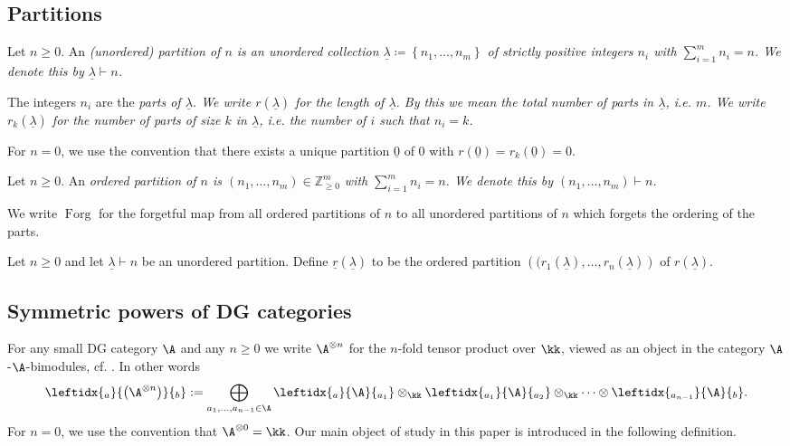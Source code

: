 \documentclass[12pt,a4paper,reqno]{amsart}
\DeclareMathOperator{\forget}{{Forg}}
\begin{document}
\subsection{Partitions}
\label{section-partitions}

\begin{defn}
Let $n \geq 0$. An \em (unordered) partition of $n$ \rm 
is an unordered collection 
$\underline{\lambda}\coloneqq \left\{ n_1, \dots, n_m \right\}$ of strictly
positive integers $n_i$ with $\sum_{i=1}^m n_i = n$. We denote this by 
$\underline{\lambda} \vdash n$. 
\end{defn}

The integers $n_i$ are the \em parts \rm of $\underline{\lambda} $. 
We write $r(\underline{\lambda} )$ for the \em length \rm of $\underline{\lambda} $. 
By this we mean the total number of parts in $\underline{\lambda}$, i.e. $m$. 
We write $r_k(\underline{\lambda} )$ for
the number of parts of size $k$ in $\underline{\lambda} $, i.e. the number of $i$ such 
that $n_i = k$.

For $n = 0$, we use the convention that there exists a unique
partition $\underline{0}$ of $0$ with $r(\underline{0}) =
r_k(\underline{0}) = 0$. 

\begin{defn}
Let $n \geq 0$. An \em ordered partition of $n$ \rm 
is $(n_1, \dots, n_m) \in \mathbb{Z}^m_{\geq 0}$ with 
$\sum_{i=1}^m n_i = n$. We denote this by $(n_1, \dots, n_m) \vdash n$. 
\end{defn}

We write $\forget$ for the forgetful map 
from all ordered partitions of $n$ to all unordered partitions of $n$ which 
forgets the ordering of the parts. 

\begin{defn}
Let $n \geq 0$ and let $\underline{\lambda}  \vdash n$ be
an unordered partition. Define $\underline{r}(\underline{\lambda} )$
to be the ordered partition $\left((r_1(\underline{\lambda} ), \dots,
r_n(\underline{\lambda} )\right)$ of $r(\underline{\lambda} )$.  
\end{defn}



\subsection{Symmetric powers of DG categories}
\label{section-symmetric-powers}

For any small DG category $\A$ and 
any $n \geq 0$ we write $\A^{\otimes n}$ for the $n$-fold tensor
product over $\kk$, viewed as an object in the category $\A$-$\A$-bimodules, cf.  
\cite[\S6.1]{Keller-DerivingDGCategories}. In other words
$$
\leftidx{_a}{\left(\A^{\otimes n}\right)}{_b} 
:= 
\bigoplus_{a_{1}, \dots, a_{n-1} \in \A} 
\leftidx{_a}{\A}{_{a_1}} \otimes_\kk
\leftidx{_{a_1}}{\A}{_{a_2}} \otimes_\kk \dots
\otimes \leftidx{_{a_{n-1}}}{\A}{_{b}}. 
$$
For $n = 0$, we use the convention that $\A^{\otimes 0} = \kk$.  Our main object of study in this paper is introduced in the following definition. 
\end{document}
